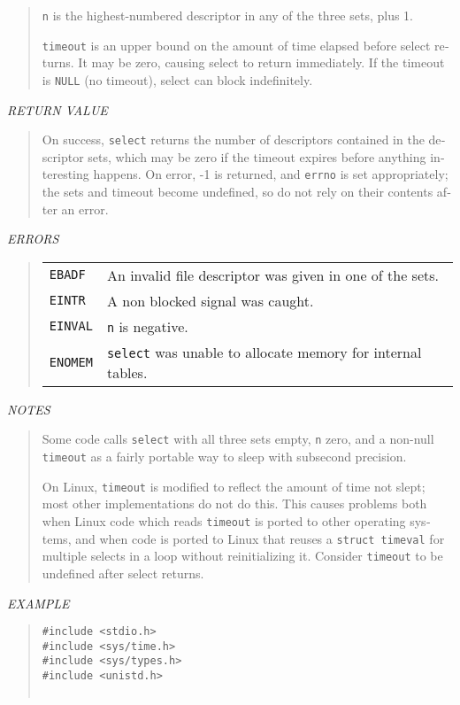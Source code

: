 \begin{appendix}
\begin{english}
\begin{quote}
	{\tt n} is the highest-numbered descriptor in any of the three sets,
	plus 1.

	{\tt timeout} is an upper bound on the amount of time elapsed before 
	select returns. It may be zero, causing select to return
	immediately. If the timeout is {\tt NULL} (no timeout), select can block
	indefinitely.
\end{quote}

{\sl RETURN VALUE}
\begin{quote}
	On success, {\tt select} returns the number of descriptors contained in
	the descriptor sets, which may be zero if the timeout expires 
	before anything interesting happens. On error, -1 is returned, and
	{\tt errno} is set appropriately; the sets and timeout become undefined,
	so do not rely on their contents after an error.
\end{quote}

{\sl ERRORS}
\begin{quote}
\begin{tabular}{lp{8cm}}
	{\tt EBADF}	&
		An invalid file descriptor was given in one of the sets.\\
	{\tt EINTR}	&
		A non blocked signal was caught.\\
	{\tt EINVAL} &
		{\tt n} is negative.\\
	{\tt ENOMEM} &
		{\tt select} was unable to allocate memory for internal
		tables.
\end{tabular}
\end{quote}

{\sl NOTES}
\begin{quote}
	Some code calls {\tt select} with all three sets empty, {\tt n} zero,
	and a non-null {\tt timeout} as a fairly portable way to sleep with
	subsecond precision.

	On Linux, {\tt timeout} is modified to reflect the amount of time
	not slept; most other implementations do not do this. This causes
	problems both when Linux code which reads {\tt timeout} is 
	ported to other operating systems, and when code is ported to Linux
	that reuses a {\tt struct timeval} for multiple selects in a 
	loop without reinitializing it. Consider {\tt timeout} to be
	undefined after select returns.
\end{quote}

{\sl EXAMPLE}
\begin{quote}
\begin{verbatim}
#include <stdio.h>
#include <sys/time.h>
#include <sys/types.h>
#include <unistd.h>


\end{verbatim}
\end{quote}
\end{english}
\end{appendix}
